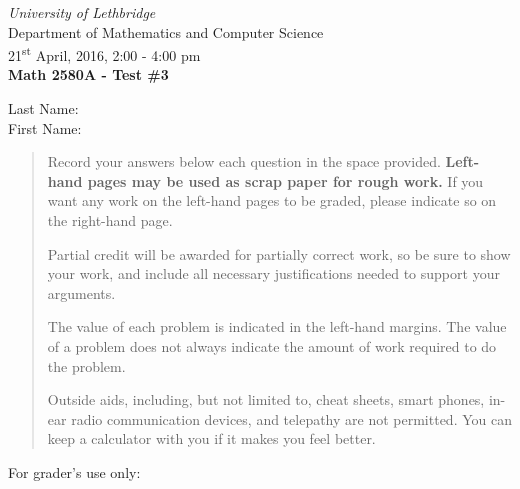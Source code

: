 \documentclass[12pt]{article}
\newcommand{\skipline}{\vspace{12pt}}
\begin{document}
\author{Instructor: Sean Fitzpatrick}
\thispagestyle{plain}
\begin{center}
\emph{University of Lethbridge}\\
Department of Mathematics and Computer Science\\
21\textsuperscript{st} April, 2016, 2:00 - 4:00 pm\\
{\bf Math 2580A - Test \#3}\\
\end{center}
\skipline \skipline \skipline \noindent \skipline
Last Name:\underline{\hspace{350pt}}\\
\skipline
First Name:\underline{\hspace{348pt}}\\
\skipline


\vspace{0.5in}


\begin{quote}
 Record your answers below each question in the space provided.    {\bf Left-hand pages may be used as scrap paper for rough work.}  If you want any work on the left-hand pages to be graded, please indicate so on the right-hand page.
 
 \bigskip
 
Partial credit will be awarded for partially correct work, so be sure to show your work, and include all necessary justifications needed to support your arguments. 

The value of each problem is indicated in the left-hand margins. The value of a problem does not always indicate the amount of work required to do the problem.

Outside aids, including, but not limited to, cheat sheets, smart phones, in-ear radio communication devices, and telepathy are not permitted. You can keep a calculator with you if it makes you feel better.
\end{quote}


\vspace{0.5in}

For grader's use only:
\end{document}
